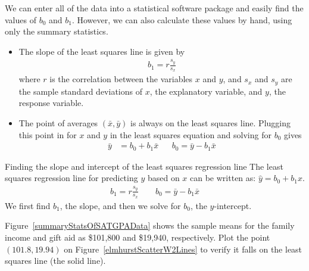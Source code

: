 We can enter all of the data into a statistical software package and easily find the values of $b_0$ and $b_1$.  However, we can also calculate these values by hand, using only the summary statistics.
\begin{itemize}
\item The slope of the least squares line is given by
\begin{eqnarray*}
b_1 = r\frac{s_y}{s_x}
\label{slopeOfLSRLine}
\end{eqnarray*}
where $r$ is the correlation between the variables $x$ and $y$, and $s_x$ and $s_y$ are the sample standard deviations of $x$, the explanatory variable, and $y$, the response variable.
\item The point of averages $(\bar{x}, \bar{y})$ is always on the least squares line. Plugging this point in for $x$ and $y$ in the least squares equation and solving for $b_0$ gives
\begin{align*}
\bar{y} &= b_0 + b_1\bar{x}
&&b_0=\bar{y}-b_1\bar{x}
\label{interceptOfLSRLine}
\end{align*}
\end{itemize}


\begin{onebox}{Finding the slope and intercept of the least squares regression line}
The least squares regression line for predicting $y$ based on $x$ can be written as:  $\hat{y}=b_0+b_1x$.  
\begin{align*}
b_1=r\frac{s_y}{s_x} \qquad b_0=\bar{y}-b_1\bar{x}
\end{align*}
We first find $b_1$, the slope, and then we solve for $b_0$, the $y$-intercept.  
\end{onebox}

\begin{exercisewrap}
\begin{nexercise}
Figure~\ref{summaryStatsOfSATGPAData} shows the sample means for the family income and gift aid as \$101,800 and \$19,940, respectively. Plot the point $(101.8, 19.94)$ on Figure~\ref{elmhurstScatterW2Lines} to verify it falls on the least squares line (the solid line).\footnotemark 
\end{nexercise}
\end{exercisewrap}


